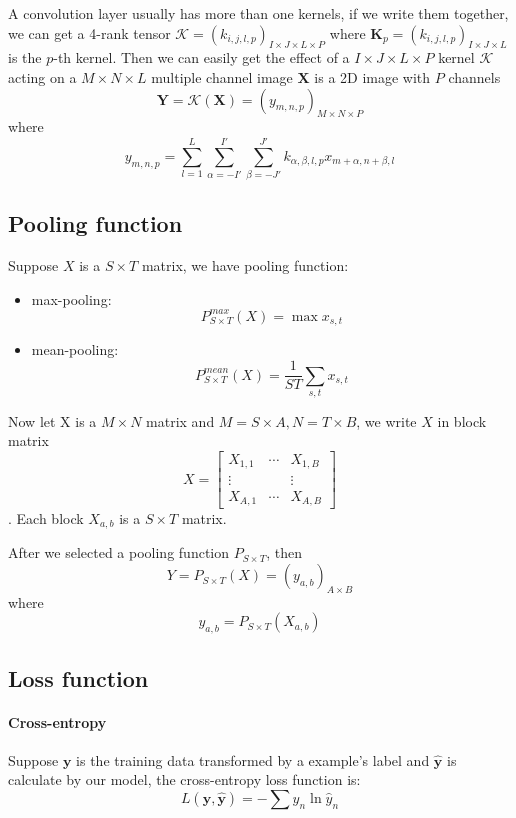 	 A convolution layer usually has more than one kernels, if we write them together, we can get a 4-rank tensor $\mathcal{K} = (k_{i,j,l,p})_{I\times J\times L\times P}$ where $\mathbf K_p = (k_{i,j,l,p})_{I\times J\times L}$ is the $p$-th kernel.
	Then we can easily get the effect of a $I\times J\times L\times P$ kernel $\mathcal K $ acting on a $M\times N \times L$ multiple channel image $\mathbf X$ is a 2D image with $P$ channels
	$$
	\mathbf Y =	\mathcal K (\mathbf X) = (y_{m,n,p})_{M\times N\times P}
	$$
	where 
	\begin{equation}
	y_{m,n,p} =\sum_{l=1}^L\sum_{\alpha = - I'}^{I'} \sum_{\beta = - J'}^{J'}k_{\alpha,\beta,l,p} x_{m+\alpha,n+\beta,l}
	\end{equation}
	\subsection{Pooling function}
	Suppose $X$ is a $S \times T$ matrix, we have pooling function:
	\begin{itemize}
		\item max-pooling: 
		$$
			P^{max}_{S\times T}(X) = \max x_{s,t}
		$$
		\item mean-pooling:
		$$
		P^{mean}_{S\times T}(X) = \dfrac 1{ST} \sum_{s,t}x_{s,t}
		$$
	\end{itemize}
	Now let X is a $M \times N$ matrix and $M=S\times A, N=T\times B$, we write $X$ in block matrix
	\begin{equation}
	X=\left[
	\begin{matrix}
	X_{1,1}&\cdots	&X_{1,B}\\
	\vdots &	  	&\vdots\\
	X_{A,1}&\cdots	&X_{A,B}
	\end{matrix}
	\right]
	\end{equation}. Each block $X_{a,b}$ is a $S\times T$ matrix.
	
	After we selected a pooling function $P_{S\times T}$, then 
	$$
		Y = P_{S\times T}(X) =(y_{a,b})_{A\times B}
	$$
	where
	\begin{equation}
	 y_{a,b} = P_{S\times T}(X_{a,b})
	\end{equation}
	
	\subsection{Loss function}\label{Loss}
	\paragraph{Cross-entropy} Suppose $\mathbf y$ is the training data transformed by a example's label and $\hat {\mathbf {y}}$ is calculate by our model, the cross-entropy loss function is:
	\begin{equation}
	L(\mathbf y,\hat {\mathbf {y}}) =- \sum y_n \ln \hat{y}_n
	\end{equation}
	
